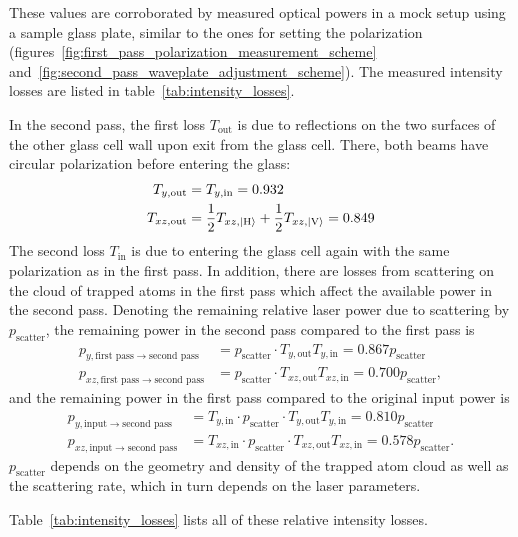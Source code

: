 These values are corroborated by measured optical powers in a mock setup using a sample glass plate, similar to the ones for setting the polarization (figures~\ref{fig:first_pass_polarization_measurement_scheme} and~\ref{fig:second_pass_waveplate_adjustment_scheme}). The measured intensity losses are listed in table~\ref{tab:intensity_losses}.

In the second pass, the first loss $T_{\text{out}}$ is due to reflections on the two surfaces of the other glass cell wall upon exit from the glass cell. There, both beams have circular polarization before entering the glass:
\begin{align}
    T_{y, \text{out}} &= T_{y, \text{in}} = 0.932 \\
    T_{xz, \text{out}} &= \frac{1}{2} T_{xz, \Ket{\text{H}}} + \frac{1}{2} T_{xz, \Ket{\text{V}}} = 0.849
\end{align}
The second loss $T_{\text{in}}$ is due to entering the glass cell again with the same polarization as in the first pass. In addition, there are losses from scattering on the cloud of trapped atoms in the first pass which affect the available power in the second pass. Denoting the remaining relative laser power due to scattering by $p_\text{scatter}$, the remaining power in the second pass compared to the first pass is
\begin{align}
    p_{y, \text{first pass} \rightarrow \text{second pass}} &= p_\text{scatter} \cdot T_{y, \text{out}} T_{y, \text{in}}   =  0.867 p_\text{scatter}\\
    p_{xz, \text{first pass} \rightarrow \text{second pass}} &= p_\text{scatter} \cdot T_{xz, \text{out}} T_{xz, \text{in}}   = 0.700 p_\text{scatter},
\end{align}
and the remaining power in the first pass compared to the original input power is
\begin{align}
    p_{y, \text{input} \rightarrow \text{second pass}} &= T_{y, \text{in}} \cdot p_\text{scatter} \cdot T_{y, \text{out}} T_{y, \text{in}} =  0.810 p_\text{scatter} \\
    p_{xz, \text{input} \rightarrow \text{second pass}} &= T_{xz, \text{in}} \cdot p_\text{scatter} \cdot T_{xz, \text{out}} T_{xz, \text{in}} = 0.578 p_\text{scatter}.
\end{align}
$p_\text{scatter}$ depends on the geometry and density of the trapped atom cloud as well as the scattering rate, which in turn depends on the laser parameters.

Table~\ref{tab:intensity_losses} lists all of these relative intensity losses.

